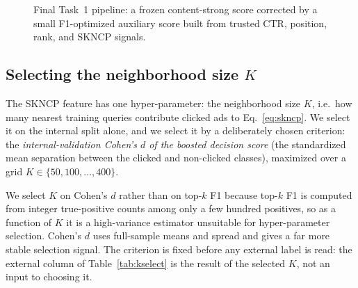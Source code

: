 \documentclass[sigconf, nonacm]{acmart}
\begin{document}
\begin{figure}[t]
\centering
{}
\caption{Final Task~1 pipeline: a frozen content-strong score corrected by a small
F1-optimized auxiliary score built from trusted CTR, position, rank, and SKNCP
signals.}
\label{fig:task1-pipeline}
\end{figure}

\subsection{Selecting the neighborhood size \texorpdfstring{$K$}{K}}
\label{sec:task1-kselect}

The SKNCP feature has one hyper-parameter: the neighborhood size $K$, i.e.\ how
many nearest training queries contribute clicked ads to
Eq.~\eqref{eq:skncp}. We select it on the internal split alone, and we select it
by a deliberately chosen criterion: the \emph{internal-validation Cohen's $d$ of
the boosted decision score} (the standardized mean separation between the
clicked and non-clicked classes), maximized over a grid
$K\in\{50,100,\dots,400\}$.

We select $K$ on Cohen's $d$ rather than on top-$k$ F1 because top-$k$ F1 is
computed from integer true-positive counts among only a few hundred positives, so
as a function of $K$ it is a high-variance estimator unsuitable for
hyper-parameter selection. Cohen's $d$ uses full-sample means and spread and
gives a far more stable selection signal. The criterion is fixed before any
external label is read: the external column of Table~\ref{tab:kselect} is the
result of the selected $K$, not an input to choosing it.
\end{document}
